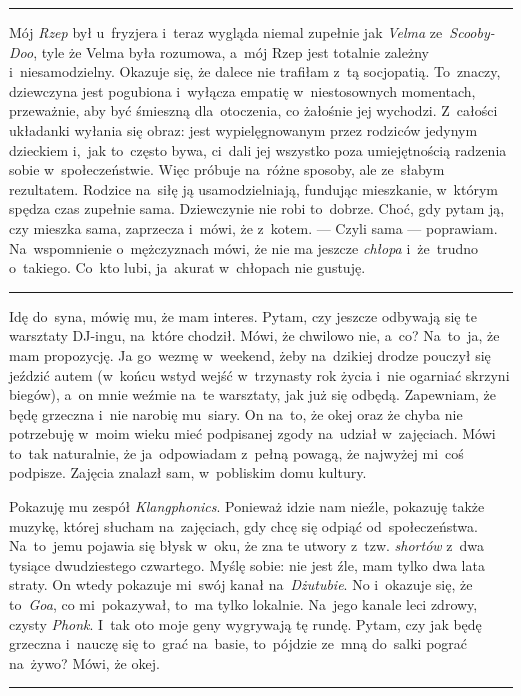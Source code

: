 \documentclass[9pt, a5paper]{memoir}
\begin{document}
\fancybreak{* \quad * \quad *}

Mój \textit{Rzep} był u~fryzjera i~teraz wygląda niemal zupełnie jak \textit{Velma} ze~\textit{Scooby-Doo}, tyle że Velma była rozumowa, a~mój Rzep jest totalnie zależny i~niesamodzielny. Okazuje się, że dalece nie trafiłam z~tą socjopatią. To~znaczy, dziewczyna jest pogubiona i~wyłącza empatię w~niestosownych momentach, przeważnie, aby być śmieszną dla~otoczenia, co żałośnie jej wychodzi. Z~całości układanki wyłania się obraz: jest wypielęgnowanym przez rodziców jedynym dzieckiem i,~jak to~często bywa, ci~dali jej wszystko poza umiejętnością radzenia sobie w~społeczeństwie. Więc próbuje na~różne sposoby, ale ze~słabym rezultatem. Rodzice na~siłę ją usamodzielniają, fundując mieszkanie, w~którym spędza czas zupełnie sama. Dziewczynie nie robi to~dobrze. Choć, gdy pytam ją, czy mieszka sama, zaprzecza i~mówi, że z~kotem. --- Czyli sama --- poprawiam. Na~wspomnienie o~mężczyznach mówi, że nie ma jeszcze \textit{chłopa} i~że~trudno o~takiego. Co~kto lubi, ja~akurat w~chłopach nie gustuję.

\fancybreak{* \quad * \quad *}

Idę do~syna, mówię mu, że mam interes. Pytam, czy jeszcze odbywają się te warsztaty DJ-ingu, na~które chodził. Mówi, że chwilowo nie, a~co? Na~to~ja, że mam propozycję. Ja go~wezmę w~weekend, żeby na~dzikiej drodze pouczył się jeździć autem (w~końcu wstyd wejść w~trzynasty rok życia i~nie ogarniać skrzyni biegów), a~on mnie weźmie na~te warsztaty, jak już się odbędą. Zapewniam, że będę grzeczna i~nie narobię mu~siary. On na~to, że okej oraz że chyba nie potrzebuję w~moim wieku mieć podpisanej zgody na~udział w~zajęciach. Mówi to~tak naturalnie, że ja~odpowiadam z~pełną powagą, że najwyżej mi~coś podpisze. Zajęcia znalazł sam, w~pobliskim domu kultury.

Pokazuję mu zespół \textit{Klangphonics}. Ponieważ idzie nam nieźle, pokazuję także muzykę, której słucham na~zajęciach, gdy chcę się odpiąć od~społeczeństwa. Na~to~jemu pojawia się błysk w~oku, że zna te utwory z~tzw. \textit{shortów} z~dwa tysiące dwudziestego czwartego. Myślę sobie: nie jest źle, mam tylko dwa lata straty. On wtedy pokazuje mi~swój kanał na~\textit{Dżutubie}. No i~okazuje się, że to~\textit{Goa}, co mi~pokazywał, to~ma tylko lokalnie. Na~jego kanale leci zdrowy, czysty \textit{Phonk}. I~tak oto moje geny wygrywają tę rundę. Pytam, czy jak będę grzeczna i~nauczę się to~grać na~basie, to~pójdzie ze~mną do~salki pograć na~żywo? Mówi, że okej.

\fancybreak{* \quad * \quad *}
\end{document}
